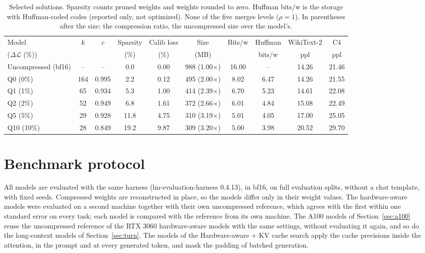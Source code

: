 \documentclass[11pt]{article}
\newcommand{\dloss}{\Delta\mathcal{L}}
\begin{document}
\begin{table}[htbp]
\centering
\footnotesize
\setlength{\tabcolsep}{3.5pt}
\begin{tabular}{lccccccccc}
\toprule
Model & $k$ & $c$ & Sparsity & Calib loss & Size & Bits/w & Huffman & WikiText-2 & C4 \\
($\dloss$ (\%)) &     &     & (\%)     & (\%)        & (MB) &        & bits/w  & ppl        & ppl \\
\midrule
Uncompressed (bf16) & --  & --    & 0.0  & 0.00 & 988 (1.00$\times$) & 16.00 & --   & 14.26 & 21.46 \\
\addlinespace
Q0  (0\%)  & 164 & 0.995 & 2.2  & 0.12 & 495 (2.00$\times$) & 8.02 & 6.47 & 14.26 & 21.55 \\
Q1  (1\%)  & 65  & 0.934 & 5.3  & 1.00 & 414 (2.39$\times$) & 6.70 & 5.23 & 14.61 & 22.08 \\
Q2  (2\%)  & 52  & 0.949 & 6.8  & 1.61 & 372 (2.66$\times$) & 6.01 & 4.84 & 15.08 & 22.49 \\
Q5  (5\%)  & 29  & 0.928 & 11.8 & 4.75 & 310 (3.19$\times$) & 5.01 & 4.05 & 17.00 & 25.05 \\
Q10 (10\%) & 28  & 0.849 & 19.2 & 9.87 & 309 (3.20$\times$) & 5.00 & 3.98 & 20.52 & 29.70 \\
\bottomrule
\end{tabular}
\caption{Selected solutions. Sparsity counts pruned weights and weights rounded to zero. Huffman bits/w
is the storage with Huffman-coded codes (reported only, not optimized). None of the five merges levels
($\rho=1$). In parentheses after the size: the compression ratio, the uncompressed size over the model's.}
\label{tab:models}
\end{table}

\section{Benchmark protocol}

All models are evaluated with the same harness (lm-evaluation-harness 0.4.13), in bf16, on full
evaluation splits, without a chat template, with fixed seeds. Compressed weights are reconstructed in
place, so the models differ only in their weight values. The hardware-aware models were evaluated on a
second machine together with their own uncompressed reference, which agrees with the first within one
standard error on every task; each model is compared with the reference from its own machine. The
A100 models of Section~\ref{sec:a100} reuse the uncompressed reference of the RTX 3060 hardware-aware
models with the same settings, without evaluating it again, and so do the long-context models of
Section~\ref{sec:turn}. The models of the Hardware-aware + KV cache search apply the cache precisions inside the attention, in the prompt
and at every generated token, and mask the padding of batched generation.
\end{document}
